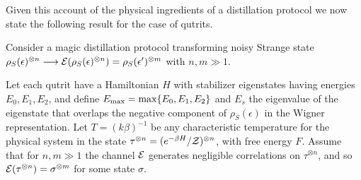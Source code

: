 \documentclass[pra,
aps,
twocolumn,
superscriptaddress,
groupedaddress,
nofootinbib,
reprint
]{revtex4-1}
\begin{document}
 Given this account of the physical ingredients of a distillation protocol we now state the following result for the case of qutrits.
\begin{theorem}\label{thm:free-energy}
	Consider a magic distillation protocol transforming noisy Strange state $\rho_S(\epsilon)^{\otimes n} \longrightarrow \mathcal{E}(\rho_S(\epsilon)^{\otimes n})=\rho_S(\epsilon')^{\otimes m}$ with $n, m \gg 1$.

Let each qutrit have a Hamiltonian $H$ with stabilizer eigenstates having energies $E_0, E_1, E_2$, and define $E_{\rm max} = \max\{E_0, E_1, E_2\}$ and $E_s$ the eigenvalue of the eigenstate that overlaps the negative component of $\rho_S(\epsilon)$ in the Wigner representation. Let $T =(k\beta)^{-1}$ be any characteristic temperature for the physical system in the state $\tau^{\otimes n}= (e^{-\beta H}/\mathcal{Z})^{\otimes n}$, with free energy $F$. Assume that for $n,m \gg 1$ the channel $\mathcal{E}$ generates negligible correlations on $\tau^{\otimes n}$, and so $\mathcal{E}(\tau^{\otimes n}) = \sigma^{\otimes m}$ for some state $\sigma$.


\end{theorem}
\end{document}
